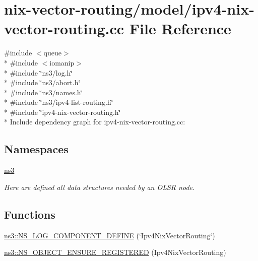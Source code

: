 \hypertarget{ipv4-nix-vector-routing_8cc}{}\section{nix-\/vector-\/routing/model/ipv4-\/nix-\/vector-\/routing.cc File Reference}
\label{ipv4-nix-vector-routing_8cc}
{\ttfamily \#include $<$queue$>$}\\*
{\ttfamily \#include $<$iomanip$>$}\\*
{\ttfamily \#include \char`\"{}ns3/log.\+h\char`\"{}}\\*
{\ttfamily \#include \char`\"{}ns3/abort.\+h\char`\"{}}\\*
{\ttfamily \#include \char`\"{}ns3/names.\+h\char`\"{}}\\*
{\ttfamily \#include \char`\"{}ns3/ipv4-\/list-\/routing.\+h\char`\"{}}\\*
{\ttfamily \#include \char`\"{}ipv4-\/nix-\/vector-\/routing.\+h\char`\"{}}\\*
Include dependency graph for ipv4-\/nix-\/vector-\/routing.cc\+:
\subsection*{Namespaces}
\begin{DoxyCompactItemize}
\item 
 \hyperlink{namespacens3}{ns3}
\begin{DoxyCompactList}\small\item\em Here are defined all data structures needed by an O\+L\+SR node. \end{DoxyCompactList}\end{DoxyCompactItemize}
\subsection*{Functions}
\begin{DoxyCompactItemize}
\item 
\hyperlink{namespacens3_a37305dea5122b0ac17952c81b4f7a9cf}{ns3\+::\+N\+S\+\_\+\+L\+O\+G\+\_\+\+C\+O\+M\+P\+O\+N\+E\+N\+T\+\_\+\+D\+E\+F\+I\+NE} (\char`\"{}Ipv4\+Nix\+Vector\+Routing\char`\"{})
\item 
\hyperlink{namespacens3_ad9b2bd6c1b0727fb6867635391020865}{ns3\+::\+N\+S\+\_\+\+O\+B\+J\+E\+C\+T\+\_\+\+E\+N\+S\+U\+R\+E\+\_\+\+R\+E\+G\+I\+S\+T\+E\+R\+ED} (Ipv4\+Nix\+Vector\+Routing)
\end{DoxyCompactItemize}
